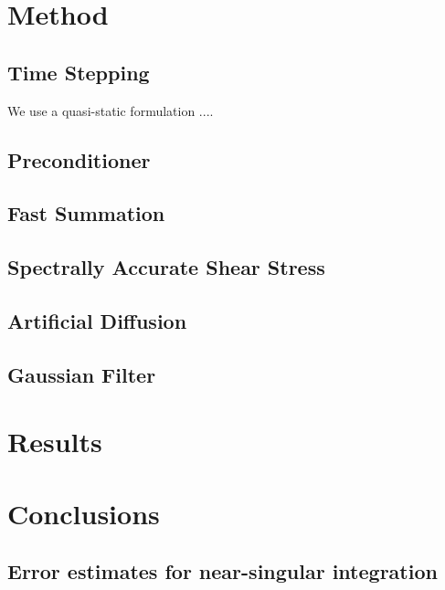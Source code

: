 \documentclass[preprint, 10pt]{elsarticle}
\begin{document}
\section{Method\label{s:method}} 

\subsection{Time Stepping} 
We use a quasi-static formulation ....

\subsection{Preconditioner} 

\subsection{Fast Summation} 

\subsection{Spectrally Accurate Shear Stress} 

\subsection{Artificial Diffusion} 

\subsection{Gaussian Filter} 

\section{Results\label{s:results}} 

\section{Conclusions\label{s:conclusions}}


\begin{appendices}
\section{Error estimates for near-singular integration \label{A:AppendixA}} 
\end{appendices}


 

\end{document}
